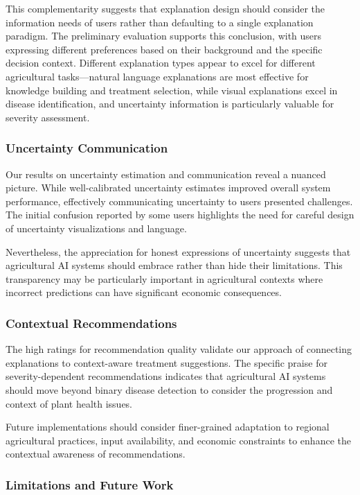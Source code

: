 This complementarity suggests that explanation design should consider the information needs of users rather than defaulting to a single explanation paradigm. The preliminary evaluation supports this conclusion, with users expressing different preferences based on their background and the specific decision context. Different explanation types appear to excel for different agricultural tasks—natural language explanations are most effective for knowledge building and treatment selection, while visual explanations excel in disease identification, and uncertainty information is particularly valuable for severity assessment.

\subsubsection{Uncertainty Communication}

Our results on uncertainty estimation and communication reveal a nuanced picture. While well-calibrated uncertainty estimates improved overall system performance, effectively communicating uncertainty to users presented challenges. The initial confusion reported by some users highlights the need for careful design of uncertainty visualizations and language.

Nevertheless, the appreciation for honest expressions of uncertainty suggests that agricultural AI systems should embrace rather than hide their limitations. This transparency may be particularly important in agricultural contexts where incorrect predictions can have significant economic consequences.

\subsubsection{Contextual Recommendations}

The high ratings for recommendation quality validate our approach of connecting explanations to context-aware treatment suggestions. The specific praise for severity-dependent recommendations indicates that agricultural AI systems should move beyond binary disease detection to consider the progression and context of plant health issues.

Future implementations should consider finer-grained adaptation to regional agricultural practices, input availability, and economic constraints to enhance the contextual awareness of recommendations.

\subsubsection{Limitations and Future Work}

